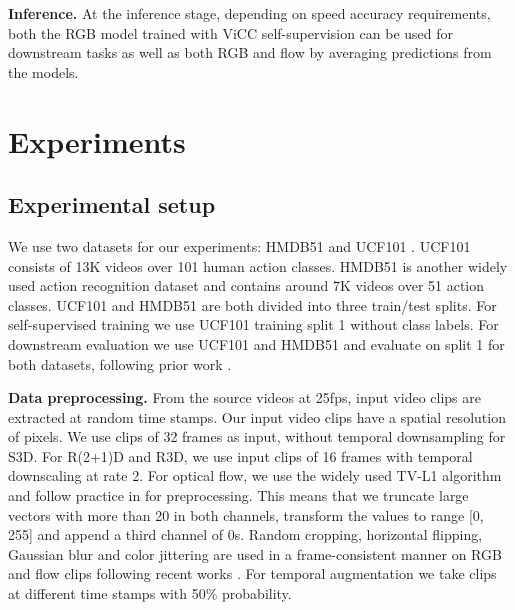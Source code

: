 \documentclass[10pt,twocolumn,letterpaper]{article}
\begin{document}
\textbf{Inference.} At the inference stage, depending on speed \vs accuracy requirements, both the RGB model  trained with ViCC self-supervision can be used for downstream tasks as well as both RGB  and flow  by averaging predictions from the models. 
 \section{Experiments} 

\subsection{Experimental setup} 
\label{sec:expsetup}

We use two datasets for our experiments: HMDB51 \cite{kuehne_hmdb_2011} and UCF101 \cite{soomro_ucf101_2012}. UCF101 consists of 13K videos over 101 human action classes. HMDB51 is another widely used action recognition dataset and contains around 7K videos over 51 action classes. UCF101 and HMDB51 are both divided into three train/test splits. For self-supervised training we use UCF101 training split 1 without class labels. For downstream evaluation we use UCF101 and HMDB51 and evaluate on split 1 for both datasets, following prior work \cite{han_self-supervised_2020}.

\textbf{Data preprocessing.} From the source videos at 25fps, input video clips are extracted at random time stamps. Our input video clips have a spatial resolution of  pixels. We use clips of 32 frames as input, without temporal downsampling for S3D. For R(2+1)D and R3D, we use input clips of 16 frames with temporal downscaling at rate 2. For optical flow, we use the widely used TV-L1 algorithm \cite{zach_duality_2007} and follow practice in \cite{carreira_quo_2017, han_self-supervised_2020} for preprocessing. This means that we truncate large vectors with more than 20 in both channels, transform the values to range [0, 255] and append a third channel of 0s. Random cropping, horizontal flipping, Gaussian blur and color jittering are used in a frame-consistent manner on RGB and flow clips following recent works \cite{chen_simple_2020, he_momentum_2020}. For temporal augmentation we take clips at different time stamps with 50\% probability. 
\end{document}
